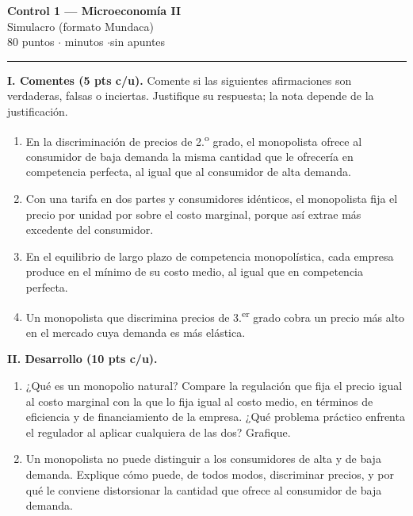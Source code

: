 \documentclass[11pt]{article}
\begin{document}
\begin{center}
{\Large\bfseries Control 1 --- Microeconomía II}\\[4pt]
{\large Simulacro (formato Mundaca)}\\[4pt]
80 puntos \quad$\cdot$ minutos \quad$\cdot$\quad sin apuntes
\end{center}

\hrule
\medskip

\textbf{I. Comentes (5 pts c/u).} Comente si las siguientes afirmaciones son verdaderas, falsas o inciertas. Justifique su respuesta; la nota depende de la justificación.

\begin{enumerate}[leftmargin=*, itemsep=8pt]
\item En la discriminación de precios de 2.\textsuperscript{o} grado, el monopolista ofrece al consumidor de baja demanda la misma cantidad que le ofrecería en competencia perfecta, al igual que al consumidor de alta demanda.

\item Con una tarifa en dos partes y consumidores idénticos, el monopolista fija el precio por unidad por sobre el costo marginal, porque así extrae más excedente del consumidor.

\item En el equilibrio de largo plazo de competencia monopolística, cada empresa produce en el mínimo de su costo medio, al igual que en competencia perfecta.

\item Un monopolista que discrimina precios de 3.\textsuperscript{er} grado cobra un precio más alto en el mercado cuya demanda es más elástica.
\end{enumerate}

\textbf{II. Desarrollo (10 pts c/u).}

\begin{enumerate}[leftmargin=*, itemsep=8pt, resume]
\item ¿Qué es un monopolio natural? Compare la regulación que fija el precio igual al costo marginal con la que lo fija igual al costo medio, en términos de eficiencia y de financiamiento de la empresa. ¿Qué problema práctico enfrenta el regulador al aplicar cualquiera de las dos? Grafique.

\item Un monopolista no puede distinguir a los consumidores de alta y de baja demanda. Explique cómo puede, de todos modos, discriminar precios, y por qué le conviene distorsionar la cantidad que ofrece al consumidor de baja demanda.
\end{enumerate}
\end{document}
